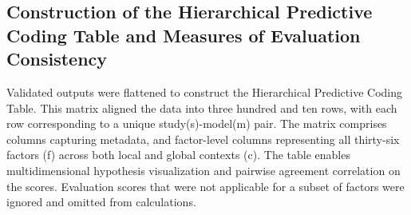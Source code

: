 \documentclass[12pt]{article}
\begin{document}
\subsection{Construction of the Hierarchical Predictive Coding Table and Measures of Evaluation Consistency}\label{construction-of-the-hierarchical-predictive-coding-table-and-measures-of-evaluation-consistency}

Validated outputs were flattened to construct the Hierarchical Predictive Coding Table. This matrix aligned the data into three hundred and ten rows, with each row corresponding to a unique study(s)-model(m) pair. The matrix comprises columns capturing metadata, and factor-level columns representing all thirty-six factors (f) across both local and global contexts (c). The table enables multidimensional hypothesis visualization and pairwise agreement correlation on the scores. Evaluation scores that were not applicable for a subset of factors were ignored and omitted from calculations.
\end{document}
